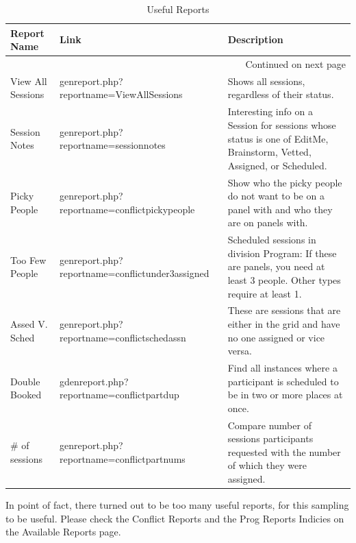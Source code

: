 \documentclass[captions=tablesignature]{scrartcl}
\begin{document}
\begin{tiny}
\begin{longtable}{|l|l|l|}
\caption{\label{tbl:usefulreports}Useful Reports}
\\
\hline
Report Name & Link & Description\\
\hline
\endhead
\hline\multicolumn{3}{r}{Continued on next page} \\
\endfoot
\endlastfoot
View All Sessions & genreport.php?reportname=ViewAllSessions & Shows all sessions, regardless of their status.\\
Session Notes & genreport.php?reportname=sessionnotes & Interesting info on a Session for sessions whose status is one of EditMe, Brainstorm, Vetted, Assigned, or Scheduled.\\
Picky People & genreport.php?reportname=conflictpickypeople & Show who the picky people do not want to be on a panel with and who they are on panels with.\\
Too Few People & genreport.php?reportname=conflictunder3assigned & Scheduled sessions in division Program: If these are panels, you need at least 3 people. Other types require at least 1.\\
Assed V. Sched & genreport.php?reportname=conflictschedassn & These are sessions that are either in the grid and have no one assigned or vice versa.\\
Double Booked & gdenreport.php?reportname=conflictpartdup & Find all instances where a participant is scheduled to be in two or more places at once.\\
\# of sessions & genreport.php?reportname=conflictpartnums & Compare number of sessions participants requested with the number of which they were assigned.\\
\hline
\end{longtable}
\end{tiny}

In point of fact, there turned out to be too many useful reports,
for this sampling to be useful.  Please check the Conflict Reports
and the Prog Reports Indicies on the Available Reports page.
\end{document}
